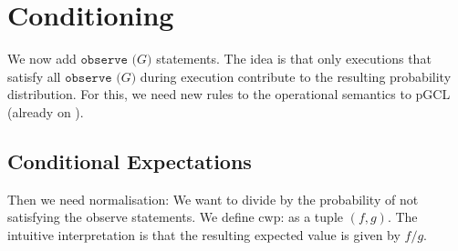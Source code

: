 \documentclass[english]{panikzettel}
\newcommand{\stmtObserve}[1]{\texttt{observe (}#1\texttt{)}}
\newcommand{\cwp}{\mathrm{cwp}}
\begin{document}
\section{Conditioning}
\label{sec:cpGCL}

We now add $\stmtObserve{G}$ statements.
The idea is that only executions that satisfy all $\stmtObserve{G}$ during execution contribute to the resulting probability distribution.
For this, we need new rules to the operational semantics to pGCL (already on ).

\subsection{Conditional Expectations}

Then we need normalisation: We want to divide by the probability of not satisfying the observe statements.
We define $\cwp$: as a tuple $(f,g)$.
The intuitive interpretation is that the resulting expected value is given by $f/g$.
\end{document}
